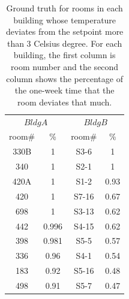 \begin{table}[ht!]
 \begin{center}
	\begin{tabular}{|c|c|c|c|}
	\multicolumn{2}{c}{$Bldg A$}
	 & \multicolumn{2}{c}{$Bldg B$}\\
	\cline{1-4} 
	 room\# & \% & room\# & \%\\
	\cline{1-4}
	 330B & 1 & S3-6 & 1\\
	\cline{1-4}
	 340 & 1 & S2-1 & 1\\
	\cline{1-4}
	420A & 1 & S1-2 & 0.93\\
	\cline{1-4}
	420 & 1 & S7-16 & 0.67\\
	\cline{1-4}
	698 & 1 & S3-13 & 0.62\\
	\cline{1-4}
	442 & 0.996 & S4-15 & 0.62\\
	\cline{1-4}
	398 & 0.981 & S5-5 & 0.57\\
	\cline{1-4}
	336 & 0.96 & S4-1 & 0.54\\
	\cline{1-4}
	183 & 0.92 & S5-16 & 0.48\\
	\cline{1-4}
	498 & 0.91 & S5-7 & 0.47\\
	\cline{1-4}
	\end{tabular}
 \end{center}
 \caption{Ground truth for rooms in each building whose temperature deviates from the setpoint more than 3 Celsius degree. For each building, the first column is room number and the second column shows the percentage of the one-week time that the room deviates that much.}
 \label{tab:cluster}
\end{table}

